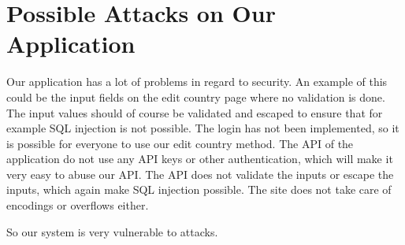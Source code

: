 \section{Possible Attacks on Our Application}
Our application has a lot of problems in regard to security.
An example of this could be the input fields on the edit country page where no validation is done. The input values should of course be validated and escaped to ensure that for example SQL injection is not possible.
The login has not been implemented, so it is possible for everyone to use our edit country method. The API of the application do not use any API keys or other authentication, which will make it very easy to abuse our API. The API does not validate the inputs or escape the inputs, which again make SQL injection possible. The site does not take care of encodings or overflows either.

So our system is very vulnerable to attacks.